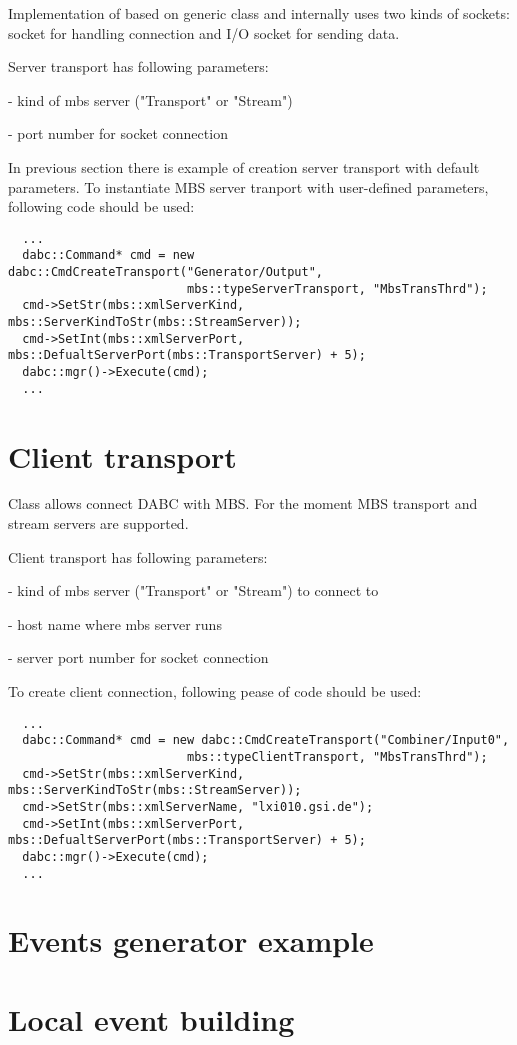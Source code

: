 Implementation of  based on generic class  and 
internally uses two kinds of sockets: socket for handling connection and I/O socket for 
sending data.
  
Server transport has following parameters:
\bbul
\item {}  - kind of mbs server ("Transport" or "Stream")  
\item {}  - port number for socket connection
\ebul

In previous section there is example of creation server transport with default
parameters. To instantiate MBS server tranport with user-defined parameters, 
following code should be used:

\begin{verbatim}
  ...
  dabc::Command* cmd = new dabc::CmdCreateTransport("Generator/Output", 
                         mbs::typeServerTransport, "MbsTransThrd");
  cmd->SetStr(mbs::xmlServerKind, mbs::ServerKindToStr(mbs::StreamServer));
  cmd->SetInt(mbs::xmlServerPort, mbs::DefualtServerPort(mbs::TransportServer) + 5);
  dabc::mgr()->Execute(cmd);
  ...
\end{verbatim}


\section{Client transport}

Class  allows connect DABC with MBS. 
For the moment MBS transport and stream servers are supported.  

Client transport has following parameters:
\bbul
\item {}  - kind of mbs server ("Transport" or "Stream") to connect to  
\item {}  - host name where mbs server runs 
\item {}  - server port number for socket connection
\ebul

To create client connection, following pease of code should be used:

\begin{verbatim}
  ...
  dabc::Command* cmd = new dabc::CmdCreateTransport("Combiner/Input0", 
                         mbs::typeClientTransport, "MbsTransThrd");
  cmd->SetStr(mbs::xmlServerKind, mbs::ServerKindToStr(mbs::StreamServer));
  cmd->SetStr(mbs::xmlServerName, "lxi010.gsi.de");
  cmd->SetInt(mbs::xmlServerPort, mbs::DefualtServerPort(mbs::TransportServer) + 5);
  dabc::mgr()->Execute(cmd);
  ...
\end{verbatim}

 

\section{Events generator example}



\section{Local event building}

